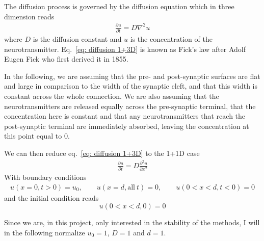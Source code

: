 \documentclass[twoside, 11pt]{article}
\begin{document}
	The diffusion process is governed by the diffusion equation which in three dimension reads
	\begin{align}
		\frac{\partial u}{\partial t} = D\nabla^2u \label{eq: diffusion 1+3D}
	\end{align}
	where $D$ is the diffusion constant and $u$ is the concentration of the neurotransmitter. Eq.~\eqref{eq: diffusion 1+3D} is known as Fick's law after Adolf Eugen Fick who first derived it in 1855. 
	
	In the following, we are assuming that the pre- and post-synaptic surfaces are flat and large in comparison to the width of the synaptic cleft, and that this width is constant across the whole connection. We are also assuming that the neurotransmitters are released equally across the pre-synaptic terminal, that the concentration here is constant and that any neurotransmitters that reach the post-synaptic terminal are immediately  absorbed, leaving the concentration at this point equal to 0.
	
	We can then reduce eq.~\eqref{eq: diffusion 1+3D} to the 1+1D case
	\begin{align}
		\frac{\partial u}{\partial t} = D\frac{\partial^2 u}{\partial x^2} \label{eq: diffusion 1+1D}
	\end{align}
	With boundary conditions
	\begin{align*}
		u(x=0, t>0) = u_0, \qquad u(x=d, \mathrm{all}~t) = 0, \qquad u(0 < x < d, t < 0) = 0
	\end{align*}
	and the initial condition reads
	$$
		u(0 < x < d, 0) = 0
	$$
	
	Since we are, in this project, only interested in the stability of the methods, I will in the following normalize $u_0 = 1$, $D = 1$ and $d = 1$. 
	
\end{document}
